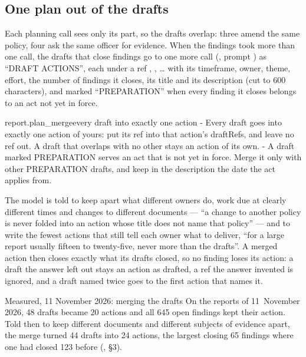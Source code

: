 \subsection{One plan out of the drafts}

Each planning call sees only its part, so the drafts overlap: three amend the same policy, four
ask the same officer for evidence. When the findings took more than one call, the drafts that
close findings go to one more call (, prompt ) as
\enquote{DRAFT ACTIONS}, each under a ref , , \ldots{} with its timeframe,
owner, theme, effort, the number of findings it closes, its title and its description (cut to
600 characters), and marked \enquote{PREPARATION} when every finding it closes belongs to an act
not yet in force.

\begin{promptexcerpt}{report.plan_merge}{every draft into exactly one action}
  - Every draft goes into exactly one action of yours: put its ref into that action's
    draftRefs, and leave no ref out. A draft that overlaps with no other stays an
    action of its own.
  - A draft marked PREPARATION serves an act that is not yet in force. Merge it only
    with other PREPARATION drafts, and keep in the description the date the act
    applies from.
\end{promptexcerpt}

The model is told to keep apart what different owners do, work due at clearly different times
and changes to different documents --- \enquote{a change to another policy is never folded into
an action whose title does not name that policy} --- and to write the fewest actions that still
tell each owner what to deliver, \enquote{for a large report usually fifteen to twenty-five,
never more than the drafts}. A merged action then closes exactly what its drafts closed, so no
finding loses its action: a draft the answer left out stays an action as drafted, a ref the
answer invented is ignored, and a draft named twice goes to the first action that names it.

\begin{lessonbox}{Measured, 11 November 2026: merging the drafts}
On the reports of 11~November 2026, 48 drafts became 20 actions and all 645 open findings kept
their action. Told then to keep different documents and different subjects of evidence apart,
the merge turned 44 drafts into 24 actions, the largest closing 65 findings where one had closed
123 before (, §3).
\end{lessonbox}

